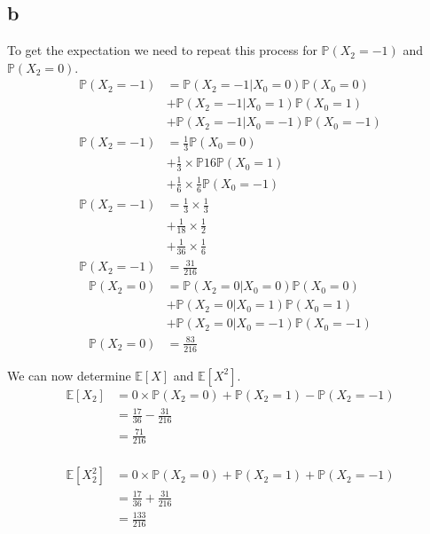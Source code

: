 \documentclass{article}
\newcommand{\prob}{\mathbb{P}}
\newcommand{\expect}{\mathbb{E}}
\begin{document}
\subsection{b}
To get the expectation we need to repeat this process for $\prob(X_2 = -1)$
and $\prob(X_2 = 0)$.
\begin{align*}
    \prob(X_2 = -1) &= \prob(X_2 = -1 | X_0 = 0) \prob(X_0 = 0) \\
                    &+ \prob(X_2 = -1 | X_0 = 1) \prob(X_0 = 1) \\
                    &+ \prob(X_2 = -1 | X_0 = -1) \prob(X_0 = -1) \\
    \prob(X_2 = -1) &= \frac{1}{3} \prob(X_0 = 0) \\
                    &+ \frac{1}{3} \times \prob{1}{6} \prob(X_0 = 1) \\
                    &+ \frac{1}{6} \times \frac{1}{6} \prob(X_0 = -1) \\
    \prob(X_2 = -1) &= \frac{1}{3} \times \frac{1}{3} \\
                    &+ \frac{1}{18} \times \frac{1}{2} \\
                    &+ \frac{1}{36} \times \frac{1}{6} \\
    \prob(X_2 = -1) &= \frac{31}{216}
\end{align*}
\begin{align*}
    \prob(X_2 = 0) &= \prob(X_2 = 0 | X_0 = 0) \prob(X_0 = 0) \\
                   &+ \prob(X_2 = 0 | X_0 = 1) \prob(X_0 = 1) \\
                   &+ \prob(X_2 = 0 | X_0 = -1) \prob(X_0 = -1) \\
    \prob(X_2 = 0) &= \frac{83}{216}
\end{align*}

We can now determine $\expect[X]$ and $\expect[X^2]$.
\begin{align*}
    \expect[X_2]&= 0 \times \prob(X_2 = 0) + \prob(X_2 = 1) - \prob(X_2 = -1) \\
                &= \frac{17}{36} - \frac{31}{216} \\
                &= \frac{71}{216} \\
\end{align*}

\begin{align*}
    \expect[X_2^2] &= 0 \times \prob(X_2 = 0)
                    + \prob(X_2 = 1) + \prob(X_2 = -1) \\
                   &= \frac{17}{36} + \frac{31}{216} \\
                   &= \frac{133}{216} \\
\end{align*}
\end{document}
